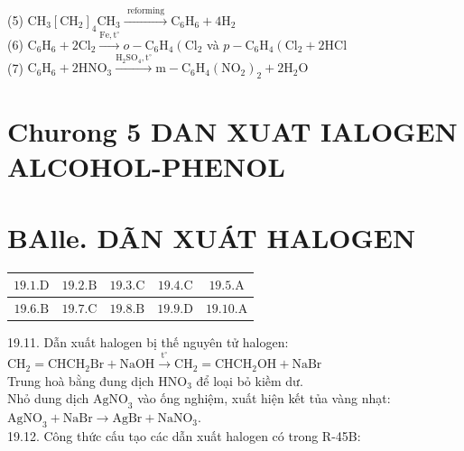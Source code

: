\documentclass[10pt]{article}
\begin{document}
(5) $\mathrm{CH}_{3}\left[\mathrm{CH}_{2}\right]_{4} \mathrm{CH}_{3} \xrightarrow{\text { reforming }} \mathrm{C}_{6} \mathrm{H}_{6}+4 \mathrm{H}_{2}$\\
(6) $\mathrm{C}_{6} \mathrm{H}_{6}+2 \mathrm{Cl}_{2} \xrightarrow{\mathrm{Fe}, \mathrm{t}^{\circ}} o-\mathrm{C}_{6} \mathrm{H}_{4}\left(\mathrm{Cl}_{2}\right.$ và $p-\mathrm{C}_{6} \mathrm{H}_{4}\left(\mathrm{Cl}_{2}+2 \mathrm{HCl}\right.$\\
(7) $\mathrm{C}_{6} \mathrm{H}_{6}+2 \mathrm{HNO}_{3} \xrightarrow{\mathrm{H}_{2} \mathrm{SO}_{4}, \mathrm{t}^{\circ}} \mathrm{m}-\mathrm{C}_{6} \mathrm{H}_{4}\left(\mathrm{NO}_{2}\right)_{2}+2 \mathrm{H}_{2} \mathrm{O}$

\section*{Churong 5 DAN XUAT IALOGEN ALCOHOL-PHENOL}
\section*{BAlle. DÃN XUÁT HALOGEN}
\begin{center}
\begin{tabular}{|c|c|c|c|c|}
\hline
$19.1 . \mathrm{D}$ & $19.2 . \mathrm{B}$ & $19.3 . \mathrm{C}$ & $19.4 . \mathrm{C}$ & $19.5 . \mathrm{A}$ \\
\hline
$19.6 . \mathrm{B}$ & $19.7 . \mathrm{C}$ & $19.8 . \mathrm{B}$ & $19.9 . \mathrm{D}$ & $19.10 . \mathrm{A}$ \\
\hline
\end{tabular}
\end{center}

19.11. Dẫn xuất halogen bị thế nguyên tử halogen:\\
$\mathrm{CH}_{2}=\mathrm{CHCH}_{2} \mathrm{Br}+\mathrm{NaOH} \xrightarrow{\mathrm{t}^{\circ}} \mathrm{CH}_{2}=\mathrm{CHCH}_{2} \mathrm{OH}+\mathrm{NaBr}$\\
Trung hoà bằng đung dịch $\mathrm{HNO}_{3}$ để loại bỏ kiềm dư.\\
Nhỏ dung dịch $\mathrm{AgNO}_{3}$ vào ống nghiệm, xuất hiện kết tủa vàng nhạt:\\
$\mathrm{AgNO}_{3}+\mathrm{NaBr} \longrightarrow \mathrm{AgBr}+\mathrm{NaNO}_{3}$.\\
19.12. Công thức cấu tạo các dẫn xuất halogen có trong R-45B:
\end{document}
